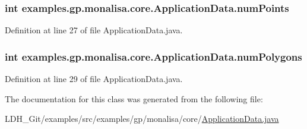 \hypertarget{classexamples_1_1gp_1_1monalisa_1_1core_1_1_application_data_a63022fe46d08350e26c59b7a284f47c7}{
\subsubsection[{num\-Points}]{\setlength{\rightskip}{0pt plus 5cm}int examples.\-gp.\-monalisa.\-core.\-Application\-Data.\-num\-Points}}\label{classexamples_1_1gp_1_1monalisa_1_1core_1_1_application_data_a63022fe46d08350e26c59b7a284f47c7}


Definition at line 27 of file Application\-Data.\-java.

\hypertarget{classexamples_1_1gp_1_1monalisa_1_1core_1_1_application_data_ada7916857f89dc2406284c927dfacc8d}{
\subsubsection[{num\-Polygons}]{\setlength{\rightskip}{0pt plus 5cm}int examples.\-gp.\-monalisa.\-core.\-Application\-Data.\-num\-Polygons}}\label{classexamples_1_1gp_1_1monalisa_1_1core_1_1_application_data_ada7916857f89dc2406284c927dfacc8d}


Definition at line 29 of file Application\-Data.\-java.



The documentation for this class was generated from the following file\-:\begin{DoxyCompactItemize}
\item 
L\-D\-H\-\_\-\-Git/examples/src/examples/gp/monalisa/core/\hyperlink{_application_data_8java}{Application\-Data.\-java}\end{DoxyCompactItemize}
